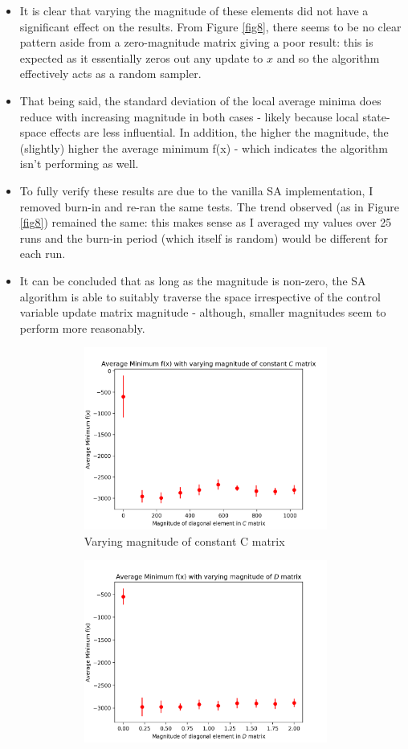 \documentclass[12pt]{article}
\begin{document}
\begin{enumerate}
\begin{enumerate}
\begin{itemize}
\begin{itemize}
		\item It is clear that varying the magnitude of these elements did not have a significant effect on the results. From Figure \ref{fig8}, there seems to be no clear pattern aside from a zero-magnitude matrix giving a poor result: this is expected as it essentially zeros out any update to $x$ and so the algorithm effectively acts as a random sampler. 
		\item That being said, the standard deviation of the local average minima does reduce with increasing magnitude in both cases - likely because local state-space effects are less influential. In addition, the higher the magnitude, the (slightly) higher the average minimum f(x) - which indicates the algorithm isn't performing as well.
		\item To fully verify these results are due to the vanilla SA implementation, I removed burn-in and re-ran the same tests. The trend observed (as in Figure \ref{fig8}) remained the same: this makes sense as I averaged my values over 25 runs and the burn-in period (which itself is random) would be different for each run.
		\item It can be concluded that as long as the magnitude is non-zero, the SA algorithm is able to suitably traverse the space irrespective of the control variable update matrix magnitude - although, smaller magnitudes seem to perform more reasonably. 
		\begin {figure}[H]
		\centering
		\begin{subfigure}{8cm}
		\centering
		\includegraphics[width=8cm]{a_C_vary}
		\caption{Varying magnitude of constant C matrix}
		\end{subfigure}%
		\begin{subfigure}{8cm}
		\centering
		\includegraphics[width=8cm]{a_D_vary}

\end{subfigure}
\end{figure}
\end{itemize}
\end{itemize}
\end{enumerate}
\end{enumerate}
\end{document}

